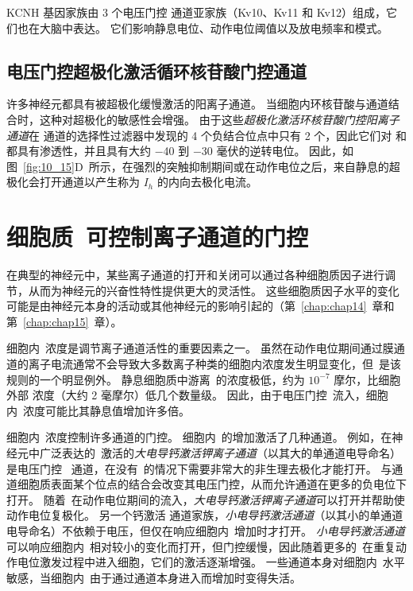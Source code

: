 KCNH 基因家族由 3 个电压门控  通道亚家族（Kv10、Kv11 和 Kv12）组成，它们也在大脑中表达。
它们影响静息电位、动作电位阈值以及放电频率和模式。



\subsection{电压门控超极化激活循环核苷酸门控通道}

许多神经元都具有被超极化缓慢激活的阳离子通道。
当细胞内环核苷酸与通道结合时，这种对超极化的敏感性会增强。
由于这些\textit{超极化激活环核苷酸门控阳离子通道}在  通道的选择性过滤器中发现的 4 个负结合位点中只有 2 个，因此它们对  和  都具有渗透性，并且具有大约 −40 到 −30 毫伏的逆转电位。
因此，如图~\ref{fig:10_15}D~所示，在强烈的突触抑制期间或在动作电位之后，来自静息的超极化会打开通道以产生称为 $I_h$ 的内向去极化电流。



\section{细胞质~可控制离子通道的门控}

在典型的神经元中，某些离子通道的打开和关闭可以通过各种细胞质因子进行调节，从而为神经元的兴奋性特性提供更大的灵活性。
这些细胞质因子水平的变化可能是由神经元本身的活动或其他神经元的影响引起的（第~\ref{chap:chap14}~章和第~\ref{chap:chap15}~章）。


细胞内~浓度是调节离子通道活性的重要因素之一。
虽然在动作电位期间通过膜通道的离子电流通常不会导致大多数离子种类的细胞内浓度发生明显变化，但~是该规则的一个明显例外。
静息细胞质中游离~的浓度极低，约为 $10^{-7}$ 摩尔，比细胞外部  浓度（大约 2 毫摩尔）低几个数量级。
因此，由于电压门控~流入，细胞内~浓度可能比其静息值增加许多倍。


细胞内~浓度控制许多通道的门控。
细胞内~的增加激活了几种通道。
例如，在神经元中广泛表达的~激活的\textit{大电导钙激活钾离子通道}（以其大的单通道电导命名）是电压门控~ 通道，在没有~的情况下需要非常大的非生理去极化才能打开。
与通道细胞质表面某个位点的结合会改变其电压门控，从而允许通道在更多的负电位下打开。
随着~在动作电位期间的流入，\textit{大电导钙激活钾离子通道}可以打开并帮助使动作电位复极化。
另一个钙激活  通道家族，\textit{小电导钙激活通道}（以其小的单通道电导命名）不依赖于电压，但仅在响应细胞内~增加时才打开。
\textit{小电导钙激活通道}可以响应细胞内~相对较小的变化而打开，但门控缓慢，因此随着更多的~在重复动作电位激发过程中进入细胞，它们的激活逐渐增强。
一些通道本身对细胞内~水平敏感，当细胞内~由于通过通道本身进入而增加时变得失活。


